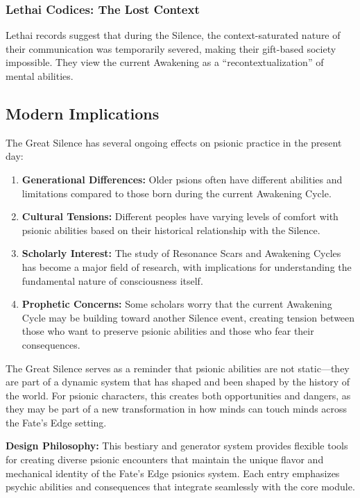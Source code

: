 \documentclass[11pt,twoside]{article}
\begin{document}
\subsubsection{Lethai Codices: The Lost Context}
Lethai records suggest that during the Silence, the context-saturated nature of their communication was temporarily severed, making their gift-based society impossible. They view the current Awakening as a ``recontextualization'' of mental abilities.

\subsection{Modern Implications}

The Great Silence has several ongoing effects on psionic practice in the present day:

\begin{enumerate}
    \item \textbf{Generational Differences:} Older psions often have different abilities and limitations compared to those born during the current Awakening Cycle.
    
    \item \textbf{Cultural Tensions:} Different peoples have varying levels of comfort with psionic abilities based on their historical relationship with the Silence.
    
    \item \textbf{Scholarly Interest:} The study of Resonance Scars and Awakening Cycles has become a major field of research, with implications for understanding the fundamental nature of consciousness itself.
    
    \item \textbf{Prophetic Concerns:} Some scholars worry that the current Awakening Cycle may be building toward another Silence event, creating tension between those who want to preserve psionic abilities and those who fear their consequences.
\end{enumerate}

The Great Silence serves as a reminder that psionic abilities are not static---they are part of a dynamic system that has shaped and been shaped by the history of the world. For psionic characters, this creates both opportunities and dangers, as they may be part of a new transformation in how minds can touch minds across the Fate's Edge setting.

\begin{center}
\begin{minipage}{0.9\textwidth}
\begin{framed}
\noindent \textbf{Design Philosophy:} This bestiary and generator system provides flexible tools for creating diverse psionic encounters that maintain the unique flavor and mechanical identity of the Fate's Edge psionics system. Each entry emphasizes psychic abilities and consequences that integrate seamlessly with the core module.
\end{framed}
\end{minipage}
\end{center}
\end{document}
